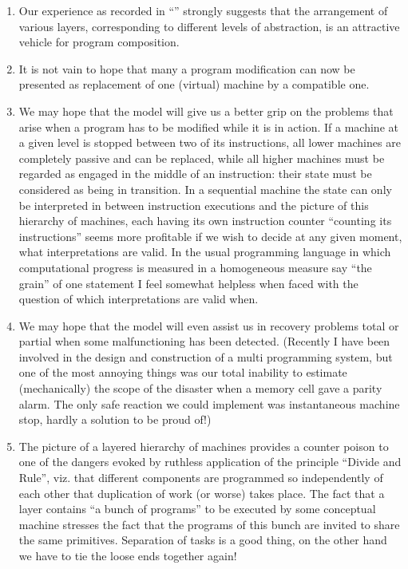 \begin{enumerate}[wide, nosep, label=(\arabic*)]
	\item Our experience as recorded in ``'' strongly suggests that the arrangement of various layers, corresponding to different levels of abstraction, is an attractive vehicle for program composition.

	\item It is not vain to hope that many a program modification can now be presented as replacement of one (virtual) machine by a compatible one.

	\item We may hope that the model will give us a better grip on the problems that arise when a program has to be modified while it is in action. If a machine at a given level is stopped between two of its instructions, all lower  machines are completely passive and can be replaced, while all higher machines must be regarded as engaged in the middle of an instruction: their state must be considered as being in transition. In a sequential machine the state can only be interpreted in between instruction executions and the picture of this hierarchy of machines, each having its own instruction counter \textemdash{}  ``counting its instructions'' \textemdash{}  seems more profitable if we wish to decide at any given moment, what interpretations are valid. In the usual programming language in which computational progress is measured in a homogeneous measure \textemdash{}  say ``the grain'' of one statement \textemdash{}  I feel somewhat helpless when faced with the question of which interpretations are valid when.
	
	\item We may hope that the model will even assist us in recovery problems 	\textemdash{}  total or partial \textemdash{}  when some malfunctioning has been detected. (Recently I have been involved in the design and construction of a multi programming system, but one of the most annoying things was our total inability to estimate (mechanically) the scope of the disaster when a memory cell gave a parity alarm. The only safe reaction we could implement was instantaneous machine stop, hardly a solution to be proud of!)
	
	\item The picture of a layered hierarchy of machines provides a counter 	poison to one of the dangers evoked by ruthless application of the principle ``Divide and Rule'', viz. that different components are programmed so independently of each other that duplication of work (or worse) takes place. The fact that a layer contains ``a bunch of programs'' to be executed by some conceptual machine stresses the fact that the programs of this bunch are invited to share the same primitives. Separation of tasks is a good thing, on the other hand we have to tie the loose ends together again!
\end{enumerate}

